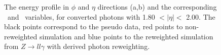 \begin{figure}[htbp]
	\begin{tcolorbox}[colback=black!5!white,colframe=white!75!black]
    \caption{The energy profile in $\phi$ and $\eta$ directions (a,b) and the corresponding \Rphi \ and \Reta \ variables, for converted photons with 1.80 $ < |\eta| < $ 2.00. The black points correspond to the pseudo data, red points to non-reweighted simulation and blue points to the reweighted simulation from $Z\rightarrow ll\gamma$ with derived photon reweighting.}
    \label{Photon:4}
    \end{tcolorbox}
    
\end{figure}

